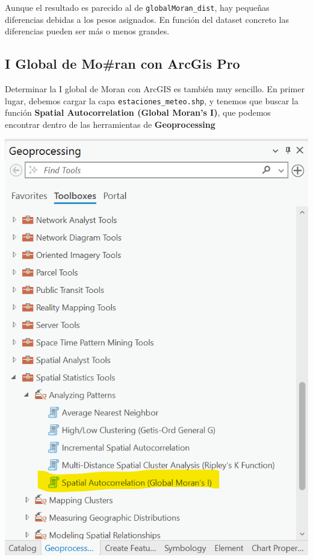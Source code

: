 \documentclass[
  letterpaper,
  DIV=11,
  numbers=noendperiod]{scrreprt}
\begin{document}
Aunque el resultado es parecido al de \texttt{globalMoran\_dist}, hay
pequeñas diferencias debidas a los pesos asignados. En función del
dataset concreto las diferencias pueden ser más o menos grandes.

\hypertarget{i-global-de-moran-con-arcgis-pro}{%
\subsection{I Global de Mo\#ran con ArcGis
Pro}\label{i-global-de-moran-con-arcgis-pro}}

Determinar la I global de Moran con ArcGIS es también muy sencillo. En
primer lugar, debemos cargar la capa \texttt{estaciones\_meteo.shp}, y
tenemos que buscar la función \textbf{Spatial Autocorrelation (Global
Moran's I)}, que podemos encontrar dentro de las herramientas de
\textbf{Geoprocessing}

\includegraphics{images/MoranIToolbox1_ArcGISPro.png}
\end{document}
